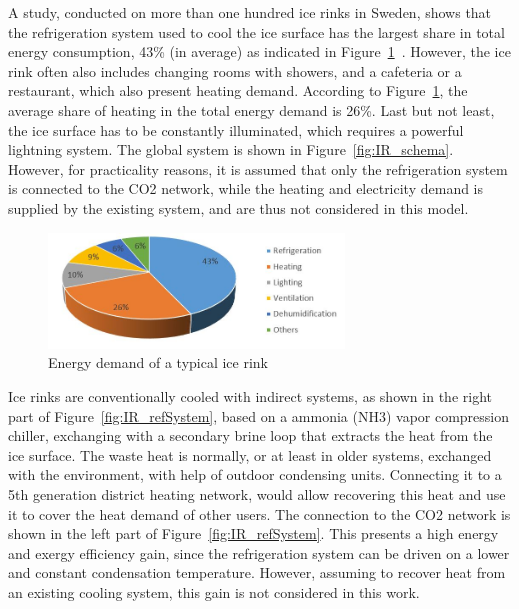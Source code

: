 \documentclass{article}
\begin{document}
A study, conducted on more than one hundred ice rinks in Sweden, shows that the refrigeration system used to cool the ice surface has the largest share in total energy consumption, 43\% (in average) as indicated in Figure~\ref{fig:IR_energyDemand}~\cite{kolasniewskiEvaluationModellingIce2017}.
However, the ice rink often also includes changing rooms with showers, and a cafeteria or a restaurant, which also present heating demand. According to Figure~\ref{fig:IR_energyDemand}, the average share of heating in the total energy demand is 26\%.
Last but not least, the ice surface has to be constantly illuminated, which requires a powerful lightning system. The global system is shown in Figure~\ref{fig:IR_schema}.\\

However, for practicality reasons, it is assumed that only the refrigeration system is connected to the CO2 network, while the heating and electricity demand is supplied by the existing system, and are thus not considered in this model.

\begin{figure}[htp]
	\centering
	\includegraphics[width=0.7\textwidth]{IR_energyDemand.JPG}
	\caption{Energy demand of a typical ice rink~\cite{kolasniewskiEvaluationModellingIce2017}}
	\label{fig:IR_energyDemand}
\end{figure}

Ice rinks are conventionally cooled with indirect systems, as shown in the right part of Figure~\ref{fig:IR_refSystem}, based on a ammonia (NH3) vapor compression chiller, exchanging with a secondary brine loop that extracts the heat from the ice surface. The waste heat is normally, or at least in older systems, exchanged with the environment, with help of outdoor condensing units. Connecting it to a 5th generation district heating network, would allow recovering this heat and use it to cover the heat demand of other users. The connection to the CO2 network is shown in the left part of Figure~\ref{fig:IR_refSystem}. This presents a high energy and exergy efficiency gain, since the refrigeration system can be driven on a lower and constant condensation temperature. However, assuming to recover heat from an existing cooling system, this gain is not considered in this work.\\
\end{document}
